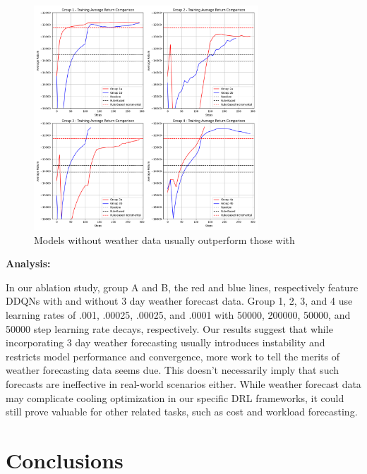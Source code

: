 \documentclass[12pt]{article}
\begin{document}
\begin{figure}[h!]
    \centering
    \includegraphics[height=0.75\textheight, width=0.75\textwidth, keepaspectratio]{images/comparison_2x2_a_b.png} %
    \caption{Models without weather data usually outperform those with}
    \label{fig:label}
\end{figure}


\textbf{Analysis:}

In our ablation study, group A and B, the red and blue lines, respectively feature DDQNs with and without 3 day weather forecast data. Group 1, 2, 3, and 4 use learning rates of .001, .00025, .00025, and .0001 with 50000, 200000, 50000, and 50000 step learning rate decays, respectively. Our results suggest that while incorporating 3 day weather forecasting usually introduces instability and restricts model performance and convergence, more work to tell the merits of weather forecasting data seems due. This doesn't necessarily imply that such forecasts are ineffective in real-world scenarios either. While weather forecast data may complicate cooling optimization in our specific DRL frameworks, it could still prove valuable for other related tasks, such as cost and workload forecasting.




\section{Conclusions}
\end{document}
